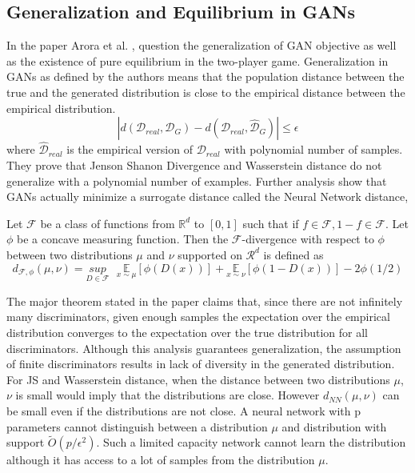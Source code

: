 \subsection*{Generalization and Equilibrium in GANs \citep{Arora03}}
In the paper Arora et al. \citep{Arora03}, question the generalization of GAN objective as well as the existence of pure equilibrium in the two-player game.  Generalization in GANs as defined by the authors means that the population distance between the true and the generated distribution is close to the empirical distance between the empirical distribution. $$|d(\mathcal{D}_{real},\mathcal{D}_{G})-d(\mathcal{\hat{D}}_{real}, \mathcal{\hat{D}}_{G})| \leq \epsilon$$ where $\mathcal{\hat{D}}_{real}$ is the empirical version of $\mathcal{D}_{real}$ with polynomial number of samples. They prove that Jenson Shanon Divergence and Wasserstein distance do not generalize with a polynomial number of examples. Further analysis show that GANs actually minimize a surrogate distance called the Neural Network distance, \begin{definition}Let $\mathcal{F}$ be a class of functions from $\mathbb{R}^d$ to $[0, 1]$ such that if $f \in \mathcal{F}, 1-f \in \mathcal{F}.$ Let $\phi$ be a concave measuring function. Then the $\mathcal{F}$-divergence with respect to $\phi$ between two distributions $\mu$ and $\nu$ supported on $\mathcal{R}^d$ is defined as $$d_{\mathcal{F},\phi}(\mu, \nu) = \underset{D\in\mathcal{F}}{sup}\mbox{ }\underset{x\sim\mu}{\mathbb{E}}[\phi(D(x))] + \underset{x\sim\nu}{\mathbb{E}}[\phi(1 - D(x))] -  2\phi(1/2) $$    
\end{definition}
The major theorem stated in the paper claims that, since there are not infinitely many discriminators, given enough samples the expectation over the empirical distribution converges to the expectation over the true distribution for all discriminators. Although this analysis guarantees generalization, the assumption of finite discriminators results in lack of diversity in the generated distribution. For JS and Wasserstein distance, when the distance between two distributions $\mu$, $\nu$ is small would imply that the distributions are close. However $d_{NN}(\mu, \nu)$ can be small even if the distributions are not close. A neural network with p parameters cannot distinguish between a distribution $\mu$ and distribution with support $\tilde{O}(p/\epsilon^2)$. Such a limited capacity network cannot learn the distribution although it has access to a lot of samples from the distribution $\mu$.

